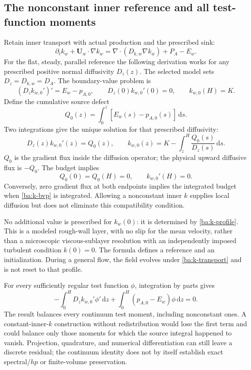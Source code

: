 \documentclass[11pt,a4paper]{article}
\numberwithin{equation}{section}
\begin{document}
\subsection{The nonconstant inner reference and all test-function moments}
\label{ba:inner-k}

Retain inner transport with actual production and the prescribed sink:
\begin{equation}
 \partial_t k_w+\boldsymbol U_w\cdot\nabla k_w
 =\nabla\cdot(D_{k,w}\nabla k_w)+P_A-E_w.
 \label{ba:k-transport}
\end{equation}
For the flat, steady, parallel reference the following derivation works
for any prescribed positive normal diffusivity $D_z(z)$. The selected
model sets $D_z=D_{k,w}=D_A$. The boundary-value problem is
\begin{equation}
 (D_zk_{w,0}')'=E_w-p_{A,0},\qquad
 D_z(0)k_{w,0}'(0)=0,\qquad k_{w,0}(H)=K.
 \label{ba:k-bvp}
\end{equation}
Define the cumulative source defect
\begin{equation}
 Q_0(z)=\int_0^z[E_w(s)-p_{A,0}(s)]\,\mathrm ds.
 \label{ba:Q}
\end{equation}
Two integrations give the unique solution for that prescribed diffusivity:
\begin{equation}
 \boxed{D_z(z)k_{w,0}'(z)=Q_0(z),\qquad
 k_{w,0}(z)=K-\int_z^H\frac{Q_0(s)}{D_z(s)}\,\mathrm ds.}
 \label{ba:k-profile}
\end{equation}
$Q_0$ is the gradient flux inside the diffusion operator; the physical
upward diffusive flux is $-Q_0$. The budget implies
\begin{equation}
 Q_0(0)=Q_0(H)=0,\qquad k_{w,0}'(H)=0.
 \label{ba:endpoint-fluxes}
\end{equation}
Conversely, zero gradient flux at both endpoints implies the integrated
budget when \eqref{ba:k-bvp} is integrated. Allowing a nonconstant inner
$k$ supplies local diffusion but does not eliminate this compatibility
condition.

No additional value is prescribed for $k_w(0)$: it is determined by
\eqref{ba:k-profile}. This is a modeled rough-wall layer, with no slip for
the mean velocity, rather than a microscopic viscous-sublayer resolution
with an independently imposed turbulent condition $k(0)=0$. The formula
defines a reference and an initialization. During a general flow, the
field evolves under \eqref{ba:k-transport} and is not reset to that profile.

For every sufficiently regular test function $\phi$, integration by parts
gives
\begin{equation}
 \boxed{-\int_0^H D_zk_{w,0}'\phi'\,\mathrm dz
       +\int_0^H(p_{A,0}-E_w)\phi\,\mathrm dz=0.}
 \label{ba:weak-equilibrium}
\end{equation}
The result balances every continuum test moment, including nonconstant
ones. A constant-inner-$k$ construction without redistribution would
lose the first term and could balance only those moments for which the
source integral happened to vanish. Projection, quadrature, and numerical
differentiation can still leave a discrete residual; the continuum
identity does not by itself establish exact spectral/$hp$ or finite-volume
preservation.
\end{document}

